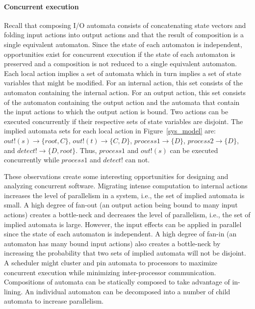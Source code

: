 \paragraph*{Concurrent execution}
Recall that composing I/O automata consists of concatenating state vectors and folding input actions into output actions and that the result of composition is a single equivalent automaton.
Since the state of each automaton is independent, opportunities exist for concurrent execution if the state of each automaton is preserved and a composition is not reduced to a single equivalent automaton.
Each local action implies a set of automata which in turn implies a set of state variables that might be modified.
For an internal action, this set consists of the automaton containing the internal action.
For an output action, this set consists of the automaton containing the output action and the automata that contain the input actions to which the output action is bound.
Two actions can be executed concurrently if their respective sets of state variables are disjoint.
The implied automata sets for each local action in Figure~\ref{sys_model} are: $out!(s) \to \{root, C\}$, $out!(t) \to \{C, D\}$, $process1 \to \{D\}$, $process2 \to \{D\}$, and $detect! \to \{D, root\}$.
Thus, $process1$ and $out!(s)$ can be executed concurrently while $process1$ and $detect!$ can not.

These observations create some interesting opportunities for designing and analyzing concurrent software.
Migrating intense computation to internal actions increases the level of parallelism in a system, i.e., the set of implied automata is small.
A high degree of fan-out (an output action being bound to many input actions) creates a bottle-neck and decreases the level of parallelism, i.e., the set of implied automata is large.
However, the input effects can be applied in parallel since the state of each automaton is independent.
A high degree of fan-in (an automaton has many bound input actions) also creates a bottle-neck by increasing the probability that two sets of implied automata will not be disjoint.
A scheduler might cluster and pin automata to processors to maximize concurrent execution while minimizing inter-processor communication.
Compositions of automata can be statically composed to take advantage of in-lining.
An individual automaton can be decomposed into a number of child automata to increase parallelism.

